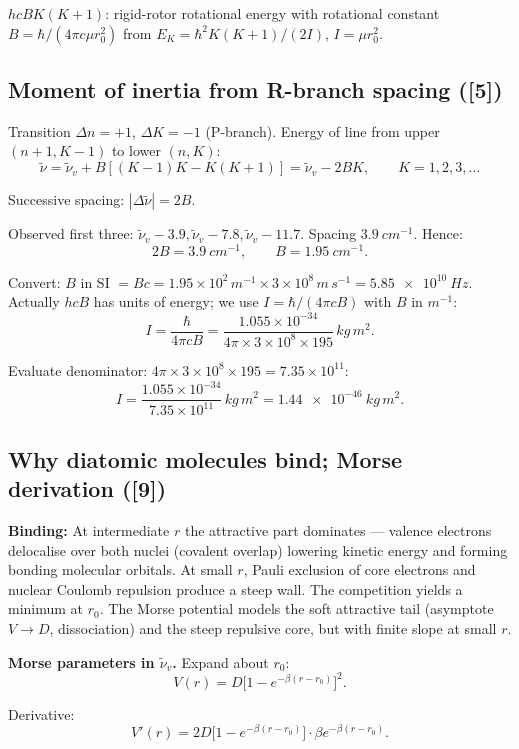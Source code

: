 \documentclass[11pt]{article}
\begin{document}
$hcBK(K+1)$: rigid-rotor rotational energy with rotational constant
$B = \hbar/(4\pi c\mu r_0^2)$ from $E_K = \hbar^2 K(K+1)/(2I)$, $I=\mu r_0^2$.

\subsection*{Moment of inertia from R-branch spacing ([5])}

Transition $\Delta n=+1$, $\Delta K=-1$ (P-branch). Energy of line from upper
$(n+1,K-1)$ to lower $(n,K)$:
\[
\tilde\nu = \tilde\nu_v + B[(K-1)K - K(K+1)] = \tilde\nu_v - 2BK,\qquad K=1,2,3,\dots
\]

Successive spacing: $|\Delta\tilde\nu| = 2B$.

Observed first three: $\tilde\nu_v - 3.9, \tilde\nu_v - 7.8, \tilde\nu_v - 11.7$.
Spacing $\SI{3.9}{cm^{-1}}$. Hence:
\[
2B = \SI{3.9}{cm^{-1}},\qquad B = \SI{1.95}{cm^{-1}}.
\]

Convert: $B$ in SI $= Bc = 1.95\times 10^2\,\si{m^{-1}}\times 3\times 10^8\,\si{m\,s^{-1}} = \SI{5.85e10}{Hz}$. Actually $hcB$ has units of energy; we use $I = \hbar/(4\pi c B)$ with $B$ in $\si{m^{-1}}$:
\[
I = \frac{\hbar}{4\pi c B} = \frac{1.055\times 10^{-34}}{4\pi\times 3\times 10^{8}\times 195}\,\si{kg\,m^2}.
\]

Evaluate denominator: $4\pi\times 3\times 10^8\times 195 = 7.35\times 10^{11}$:
\[
I = \frac{1.055\times 10^{-34}}{7.35\times 10^{11}}\,\si{kg\,m^2} = \boxed{\SI{1.44e-46}{kg\,m^2}}.
\]

\subsection*{Why diatomic molecules bind; Morse derivation ([9])}

\textbf{Binding:} At intermediate $r$ the attractive part dominates --- valence
electrons delocalise over both nuclei (covalent overlap) lowering kinetic energy
and forming bonding molecular orbitals. At small $r$, Pauli exclusion of core
electrons and nuclear Coulomb repulsion produce a steep wall. The competition
yields a minimum at $r_0$. The Morse potential models the soft attractive tail
(asymptote $V\to D$, dissociation) and the steep repulsive core, but with finite
slope at small $r$.

\textbf{Morse parameters in $\tilde\nu_v$.} Expand about $r_0$:
\[
V(r) = D\bigl[1 - e^{-\beta(r-r_0)}\bigr]^2.
\]

Derivative:
\[
V'(r) = 2D\bigl[1-e^{-\beta(r-r_0)}\bigr]\cdot\beta e^{-\beta(r-r_0)}.
\]
\end{document}
